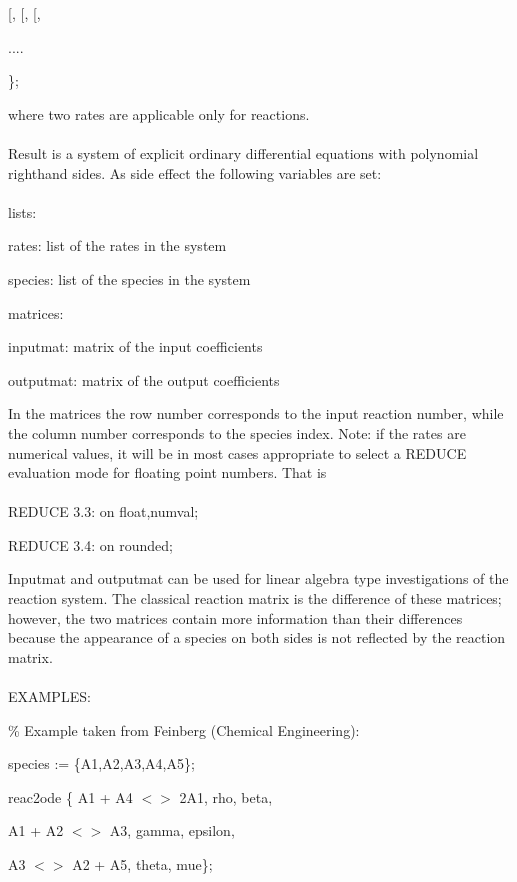 \documentclass[a4paper]{article}
\begin{document}
 {[}, {[}, {[},\meta{rate}{]}{]}{]} 

 .... 

 \};

where two rates are applicable only for \meta{} reactions. \\
\ \\
 Result is a system of explicit ordinary differential
 equations with polynomial righthand sides. As side
 effect the following variables are set: \\
\ \\
 lists:



 rates: list of the rates in the system



 species: list of the species in the system



 matrices:



 inputmat: matrix of the input coefficients



 outputmat: matrix of the output coefficients

In the matrices the row number corresponds to the input reaction 
number, while the column number corresponds to the species index.
Note: if the rates are numerical values, it will be in most cases
appropriate to select a REDUCE evaluation mode for floating
point numbers. That is \\
\ \\

 REDUCE 3.3: on float,numval;

 REDUCE 3.4: on rounded;

Inputmat and outputmat can be used for linear algebra type 
investigations of the reaction system. The classical reaction 
matrix is the difference of these matrices; however, the two 
matrices contain more information than their differences because 
the appearance of a species on both sides is not reflected by 
the reaction matrix. \\
\ \\
EXAMPLES:

\% Example taken from Feinberg (Chemical Engineering):


 species := \{A1,A2,A3,A4,A5\};


 reac2ode \{ A1 + A4 $<>$ 2A1, rho, beta,

 A1 + A2 $<>$ A3, gamma, epsilon,

 A3 $<>$ A2 + A5, theta, mue\};
 
\end{document}
